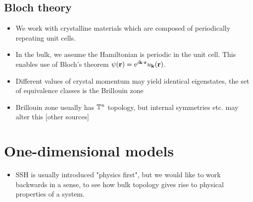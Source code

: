 \subsection{Bloch theory}
{\color{blue}
\begin{itemize}
	\item We work with crystalline materials which are composed of periodically repeating unit cells.
	
	\item In the bulk, we assume the Hamiltonian is periodic in the unit cell. This enables use of Bloch's theorem\cite{Bloch_theorem} $\psi(\vb{r}) = {\rm e}^{i\vb{k}\cdot\vb{r}}u_{\vb{k}}(\vb{r})$.
	
	\item Different values of crystal momentum may yield identical eigenstates, the set of equivalence classes is the Brillouin zone
	
	\item Brillouin zone usually has $\mathbb{T}^n$ topology, but internal symmetries etc. may alter this\cite{Foncesca-Vaidya_nonorientable} [other sources]
\end{itemize}
}


\section{One-dimensional models}
{\color{blue}
\begin{itemize}
	\item SSH is usually introduced "physics first", but we would like to work backwards in a sense, to see how bulk topology gives rise to physical properties of a system.
\end{itemize}
}

